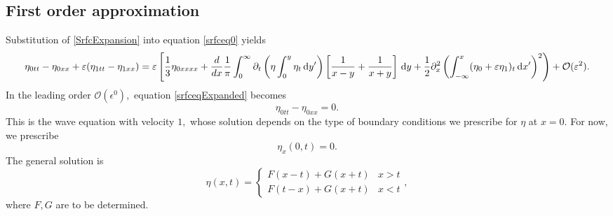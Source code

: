 \documentclass[10pt,reqno,oneside,a4paper, landscape]{article}
\begin{document}
\subsection{First order approximation}
Substitution of \eqref{SrfcExpansion} into equation \eqref{srfceq0} yields
\begin{equation}\label{srfceqExpanded}
\eta_{0tt} - \eta_{0xx} +\varepsilon(\eta_{1tt} - \eta_{1xx})= \varepsilon \left[ \frac{1}{3}\eta_{0xxxx} +  \frac{d}{dx} \frac{1}{\pi} \int_0^\infty \partial_t \left( \eta \int^{y}_0\eta_{t} \,\mathrm{d} y' \right) \left[ \frac{1}{x-y} + \frac{1}{x+y} \right] \,\mathrm{d} y+ \frac{1}{2} \partial^2_x \left( \int^{x}_{-\infty} (\eta_0 + \varepsilon \eta_1)_t \,\mathrm{d} x' \right)^2\right) + \mathcal{O}(\varepsilon^2). 
\end{equation}
In the leading order $\mathcal{O}(\epsilon^0),$ equation \eqref{srfceqExpanded} becomes
\begin{equation}\label{1stOrderApprox}
\eta_{0tt} - \eta_{0xx} = 0.
\end{equation}
This is the wave equation with velocity $1,$ whose solution depends on the type of boundary conditions we prescribe for $\eta$ at $x=0.$ For now, we prescribe 
\[ \eta_x(0,t) = 0.\]
The general solution is 
\[ \eta(x,t) = \begin{cases} F(x-t) + G(x+t) & x>t \\ F(t-x) + G(x+t) & x<t \end{cases}, \] 
where $F,G$ are to be determined. 
\end{document}
